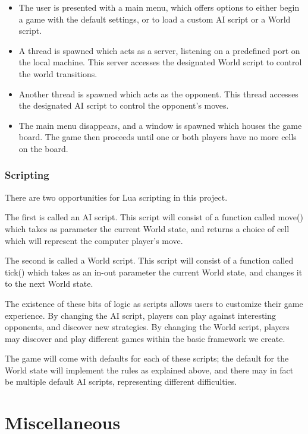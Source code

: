 \documentclass[letterpaper]{article}
\begin{document}
\begin{itemize}
	\item The user is presented with a main menu, which offers options to either begin a game with the default settings, or to load a custom AI script or a World script.
	\item A thread is spawned which acts as a server, listening on a predefined port on the local machine. This server accesses the designated World script to control the world transitions.
	\item Another thread is spawned which acts as the opponent. This thread accesses the designated AI script to control the opponent's moves.
	\item The main menu disappears, and a window is spawned which houses the game board. The game then proceeds until one or both players have no more cells on the board.
\end{itemize}

\subsubsection{Scripting}

There are two opportunities for Lua scripting in this project.

The first is called an AI script. This script will consist of a function called move() which takes as parameter the current World state, and returns a choice of cell which will represent the computer player's move.

The second is called a World script. This script will consist of a function called tick() which takes as an in-out parameter the current World state, and changes it to the next World state.

The existence of these bits of logic as scripts allows users to customize their game experience. By changing the AI script, players can play against interesting opponents, and discover new strategies. By changing the World script, players may discover and play different games within the basic framework we create.

The game will come with defaults for each of these scripts; the default for the World state will implement the rules as explained above, and there may in fact be multiple default AI scripts, representing different difficulties.

\section{Miscellaneous}
\end{document}
